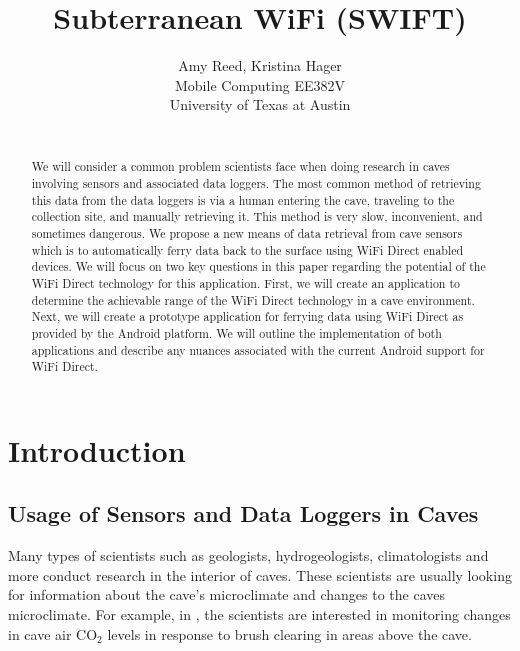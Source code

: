 \documentclass[10pt,twocolumn]{article}
\begin{document}
\title{Subterranean WiFi (SWIFT)}

\author{Amy Reed, Kristina Hager\\
Mobile Computing EE382V\\
University of Texas at Austin\\
\\
}

\maketitle
\thispagestyle{empty}

\begin{abstract}
	We will consider a common problem scientists face when doing research in caves 
	involving sensors and associated data loggers.
	The most common method of retrieving this data from the data loggers is via a human entering 
	the cave, traveling to the collection site, and manually retrieving it. 
	This method is very slow, inconvenient, and sometimes dangerous.
	We propose a new means of data retrieval from cave sensors which is to automatically 
	ferry data back to the surface using WiFi Direct enabled devices. 
	We will focus on two key questions in this paper regarding the potential of the WiFi Direct technology for this application.
	First, we will create an application to determine the achievable range of the WiFi Direct technology in a cave environment.
	Next, we will create a prototype application for ferrying data using WiFi Direct as provided by the Android platform. 
	We will outline the implementation of both applications and describe any nuances associated with the current Android 
	support for WiFi Direct.
\end{abstract}

\tableofcontents

\section{Introduction}

\subsection{Usage of Sensors and Data Loggers in Caves}
\label{sec:Usage of Sensors and Data Loggers in Caves}
Many types of scientists such as geologists, hydrogeologists, climatologists and more conduct research in the interior of caves. 
These scientists are usually looking for information about the cave's microclimate and changes to the caves microclimate. 
For example, in \cite{wong2010}, the scientists are interested in monitoring changes in cave air CO$_2$ levels in response to brush clearing in areas above the cave. 
\end{document}
